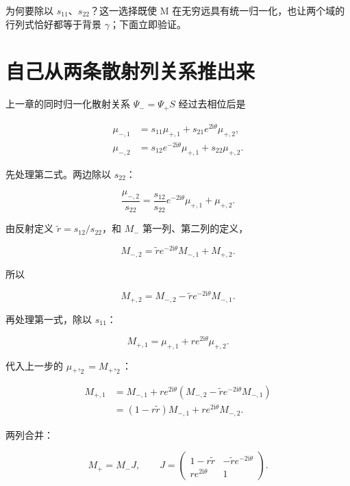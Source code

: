 为何要除以 $s_{11}$、$s_{22}$？这一选择既使 M 在无穷远具有统一归一化，也让两个域的行列式恰好都等于背景 $\gamma{}$；下面立即验证。\par

\section{自己从两条散射列关系推出来}
\par

上一章的同时归一化散射关系 $\Psi{}_{-}=\Psi{}_{+}S$ 经过去相位后是\par

\[
\begin{aligned}
\mu_{-,1}
&=s_{11}\mu_{+,1}
+s_{21}e^{2\mathrm{i}\theta}\mu_{+,2},\\
\mu_{-,2}
&=s_{12}e^{-2\mathrm{i}\theta}\mu_{+,1}
+s_{22}\mu_{+,2}.
\end{aligned}
\]

先处理第二式。两边除以 $s_{22}$：\par

\[
\dfrac{\mu_{-,2}}{s_{22}}
=\dfrac{s_{12}}{s_{22}}e^{-2\mathrm{i}\theta}\mu_{+,1}
+\mu_{+,2}.
\]

由反射定义 $\widetilde r=s_{12}/s_{22}$，和 $M_{-}$ 第一列、第二列的定义，\par

\[
M_{-,2}
=\widetilde r e^{-2\mathrm{i}\theta}M_{-,1}
+M_{+,2}.
\]

所以\par

\[
M_{+,2}=M_{-,2}-\widetilde r e^{-2\mathrm{i}\theta}M_{-,1}.
\]

再处理第一式，除以 $s_{11}$：\par

\[
M_{+,1}
=\mu_{+,1}+r e^{2\mathrm{i}\theta}\mu_{+,2}.
\]

代入上一步的 $\mu{}_{+},_{2}=M_{+},_{2}$：\par

\[
\begin{aligned}
M_{+,1}
&=M_{-,1}
+r e^{2\mathrm{i}\theta}
\left(M_{-,2}-\widetilde r e^{-2\mathrm{i}\theta}M_{-,1}\right)\\
&=(1-r\widetilde r)M_{-,1}
+r e^{2\mathrm{i}\theta}M_{-,2}.
\end{aligned}
\]

两列合并：\par

\[
M_+=M_-J,
\qquad
J=\begin{pmatrix}
1-r\widetilde r&-\widetilde r e^{-2\mathrm{i}\theta}\\
r e^{2\mathrm{i}\theta}&1
\end{pmatrix}.
\]

